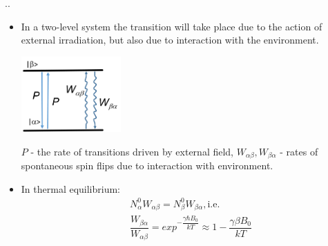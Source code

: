 \documentclass[handout]{beamer}
\begin{document}
\begin{frame}{\thesection.\thesubsection. \insertsubsection}
	\begin{itemize}[<+>]
	\item In a two-level system the transition will take place due to the action of external irradiation, but also due to interaction with the environment.
	\begin{minipage}{1.0\textwidth}
		\centering\includegraphics[width=0.3\textwidth]{two_level_population.png}
	\end{minipage}
	$P$ - the rate of transitions driven by external field, $W_{\alpha \beta}, W_{\beta \alpha}$ - rates of spontaneous spin flips due to interaction with environment.
	\item
	In thermal equilibrium:
	\begin{align}
		&N_{\alpha}^0 W_{\alpha \beta} = N_{\beta}^0 W_{\beta \alpha}, \text{i.e.} \\
		&\dfrac{ W_{\beta   \alpha }}{ W_{\alpha  \beta  }} = exp^{-\dfrac{\gamma \hbar B_0}{kT}} \approx 1-\dfrac{\gamma \beta B_0}{kT}
	\end{align}
	\end{itemize}
\end{frame}
\end{document}
